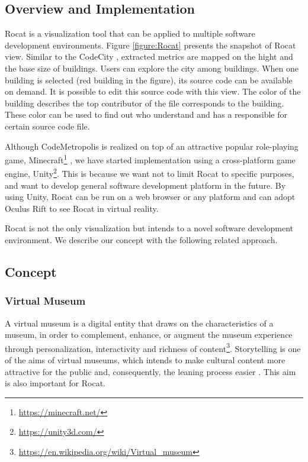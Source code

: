 \documentclass[conference]{IEEEtran}
\newcommand{\figref}[1]{Figure \ref{#1}}
\begin{document}
\subsection{Overview and Implementation}
Rocat is a visualization tool that can be applied to multiple software development environments.
\figref{figure:Rocat} presents the snapshot of Rocat view.
Similar to the CodeCity \cite{Wettel:2011:SSC:1985793.1985868}, extracted metrics are mapped on the hight and the base size of buildings.
Users can explore the city among buildings.
When one building is selected (red building in the figure), its source code can be available on demand.
It is possible to edit this source code with this view.
The color of the building describes the top contributor of the file corresponds to the building.
These color can be used to find out who understand and has a responsible for certain source code file.

Although CodeMetropolis is realized on top of an attractive popular role-playing game, Minecraft\footnote{\url{https://minecraft.net/}} \cite{6648194}, we have started implementation using a cross-platform game engine, Unity\footnote{\url{https://unity3d.com/}}.
This is because we want not to limit Rocat to specific purposes, and want to develop general software development platform in the future.
By using Unity, Rocat can be run on a web browser or any platform and can adopt Oculus Rift to see Rocat in virtual reality.

Rocat is not the only visualization but intends to a novel software development environment.
We describe our concept with the following related approach.


\subsection{Concept}
\subsubsection{Virtual Museum}
A virtual museum is a digital entity that draws on the characteristics of a museum, in order to complement, enhance, or augment the museum
experience through personalization, interactivity and richness of content\footnote{\url{https://en.wikipedia.org/wiki/Virtual_museum}}.
Storytelling is one of the aims of virtual museums, which intends to make cultural content more attractive for the public and, consequently, the leaning process easier \cite{Pietroni:2014:IVR:2635823.2611375}.
This aim is also important for Rocat.
\end{document}
